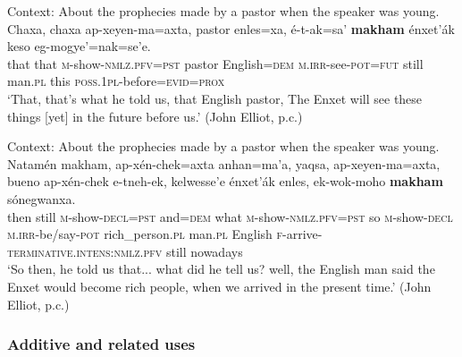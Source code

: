 \begin{exe}
	\ex\label{exAppendixEnxetSurProspective1}
	Context: About the prophecies made by a pastor when the speaker was young.\\
	\gll Chaxa, chaxa ap-xeyen-ma=axta, pastor enles=xa, é-t-ak=sa' \textbf{makham} énxet'ák keso eg-mogye'=nak=se'e.\\
	that that \textsc{m}-show-\textsc{nmlz}.\textsc{pfv}=\textsc{pst} pastor English=\textsc{dem} \textsc{m}.\textsc{irr}-see-\textsc{pot}=\textsc{fut} still man.\textsc{pl} this \textsc{poss}.1\textsc{pl}-before=\textsc{evid}=\textsc{prox}\\
	\glt \lq That, that’s what he told us, that English pastor, The Enxet will see these things [yet] in the future before us.' (John Elliot, p.c.)

	\ex Context: About the prophecies made by a pastor when the speaker was young.\\
	\label{exAppendixEnxetSurProspective2}
	\gll Natamén makham, ap-xén-chek=axta anhan=ma'a, yaqsa, ap-xeyen-ma=axta, bueno ap-xén-chek e-tneh-ek, kelwesse'e énxet'ák enles, ek-wok-moho \textbf{makham} sónegwanxa.\\
	then still \textsc{m}-show-\textsc{decl}=\textsc{pst} and=\textsc{dem} what \textsc{m}-show-\textsc{nmlz}.\textsc{pfv}=\textsc{pst} so \textsc{m}-show-\textsc{decl} \textsc{m}.\textsc{irr}-be/say-\textsc{pot} rich\_person.\textsc{pl} man.\textsc{pl} English \textsc{f}-arrive-\textsc{terminative}.\textsc{intens}:\textsc{nmlz}.\textsc{pfv} still nowadays\\
	\glt \lq So then, he told us that... what did he tell us? well, the English man said the Enxet would become rich people, when we arrived in the present time.' (John Elliot, p.c.)
\end{exe}


\subsubsection{Additive and related uses}
